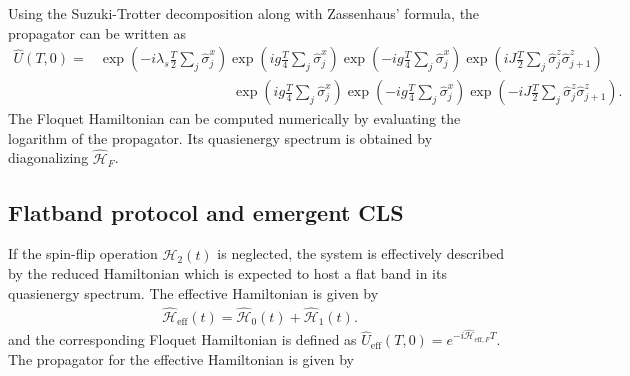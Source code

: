 \documentclass[a4paper,10pt]{article}
\begin{document}
Using the Suzuki-Trotter decomposition along with Zassenhaus’ formula, the propagator can be written as
\begin{align}
    \hat{U}(T,0) =& \exp\left(-i \lambda_s \frac{T}{2} \sum_{j}\hat{\sigma}_j^x\right)
    \exp\left(i g \frac{T}{4} \sum_{j}\hat{\sigma}_j^x\right)
    \exp\left(-i g \frac{T}{4} \sum_{j}\hat{\sigma}_j^x\right)\exp\left(i J \frac{T}{2} \sum_{j} \hat{\sigma}_j^z \hat{\sigma}_{j+1}^z\right)\nonumber\\
    &\hspace{4cm}\exp\left(i g \frac{T}{4} \sum_{j}\hat{\sigma}_j^x\right)\exp\left(-i g \frac{T}{4} \sum_{j}\hat{\sigma}_j^x\right)\exp\left(-i J \frac{T}{2} \sum_{j} \hat{\sigma}_j^z \hat{\sigma}_{j+1}^z\right).
\end{align}
The Floquet Hamiltonian can be computed numerically by evaluating the logarithm of the propagator. Its quasienergy spectrum is obtained by diagonalizing $\hat{\mathcal{H}}_F$.

\subsection{Flatband protocol and emergent CLS}
If the spin-flip operation $\hat{\mathcal{H}}_2(t)$ is neglected, the system is effectively described by the reduced Hamiltonian which is expected to host a flat band in its quasienergy spectrum. The effective Hamiltonian is given by
\begin{align}
    \hat{\mathcal{H}}_{\text{eff}}(t) = \hat{\mathcal{H}}_0(t) + \hat{\mathcal{H}}_1(t).
\end{align}
and the corresponding Floquet Hamiltonian is defined as $\hat{U}_{\text{eff}}(T,0) = e^{-i \hat{\mathcal{H}}_{\text{eff},F} T}$. The propagator for the effective Hamiltonian is given by
\end{document}

